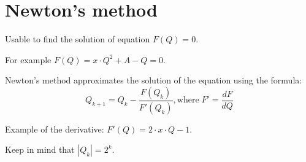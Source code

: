 \section*{Newton's method}

Usable to find the solution of equation $F(Q) = 0$.

For example $F(Q) = x \cdot Q^2 + A - Q = 0$.

Newton's method approximates the solution of the equation using the formula: 
$$Q_{k + 1} = Q_{k} - \frac{F(Q_k)}{F'(Q_k)}, \text{where}\; F' = \frac{dF}{dQ}$$

Example of the derivative: $F'(Q) = 2 \cdot x \cdot Q - 1$.

Keep in mind that $|Q_{k}| = 2^k$.

